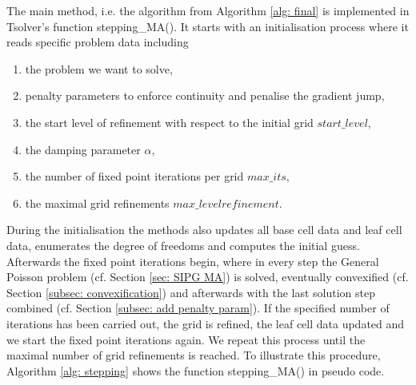 The main method, i.e. the algorithm from Algorithm \ref{alg: final} is implemented in Tsolver's function stepping\_MA(). It starts with an initialisation process where it reads specific problem data including
\begin{enumerate}
 \item the problem we want to solve,
 \item penalty parameters to enforce continuity and penalise the gradient jump,
 \item the start level of refinement with respect to the initial grid $start\_level$,
 \item the damping parameter $\alpha$,
 \item the number of fixed point iterations per grid $max\_its$,
 \item the maximal grid refinements $max\_levelrefinement$.
\end{enumerate}
During the initialisation the methods also updates all base cell data and leaf cell data, enumerates the degree of freedoms and computes the initial guess.\\
Afterwards the fixed point iterations begin, where in every step the General Poisson problem (cf. Section \ref{sec: SIPG MA}) is solved, eventually convexified (cf. Section \ref{subsec: convexification}) and afterwards with the last solution step combined (cf. Section \ref{subsec: add penalty param}). If the specified number of iterations has been carried out, the grid is refined, the leaf cell data updated and we start the fixed point iterations again.
We repeat this process until the maximal number of grid refinements is reached.
To illustrate this procedure, Algorithm \ref{alg: stepping} shows the function stepping\_MA() in pseudo code.
